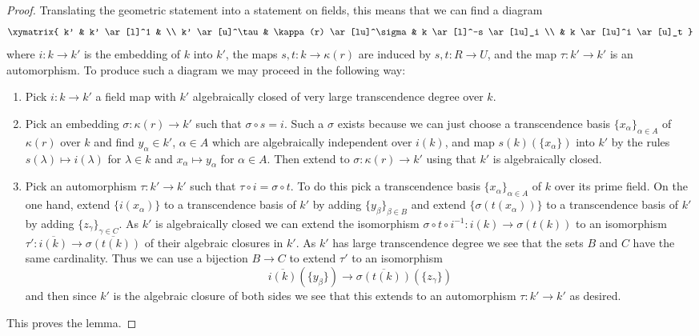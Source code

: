 \begin{proof}
Translating the geometric statement into a statement on fields,
this means that we can find a diagram
$$
\xymatrix{
k' & k' \ar[l]^1 & \\
k' \ar[u]^\tau & \kappa(r) \ar[lu]^\sigma & k \ar[l]^-s \ar[lu]_i \\
& k \ar[lu]^i \ar[u]_t
}
$$
where $i : k \to k'$ is the embedding of $k$ into $k'$,
the maps $s, t : k \to \kappa(r)$ are induced by $s, t : R \to U$, and
the map $\tau : k' \to k'$ is an automorphism. To produce such
a diagram we may proceed in the following way:
\begin{enumerate}
\item Pick $i : k \to k'$ a field map with $k'$ algebraically closed of
very large transcendence degree over $k$.
\item Pick an embedding $\sigma : \kappa(r) \to k'$ such that
$\sigma \circ s = i$. Such a $\sigma$ exists because we can just
choose a transcendence basis $\{x_\alpha\}_{\alpha \in A}$ of $\kappa(r)$
over $k$ and find $y_\alpha \in k'$, $\alpha \in A$ which are algebraically
independent over $i(k)$, and map $s(k)(\{x_\alpha\})$ into $k'$ by
the rules $s(\lambda) \mapsto i(\lambda)$ for $\lambda \in k$
and $x_\alpha \mapsto y_\alpha$ for $\alpha \in A$.
Then extend to $\sigma : \kappa(r) \to k'$ using that $k'$ is
algebraically closed.
\item Pick an automorphism $\tau : k' \to k'$ such that
$\tau \circ i = \sigma \circ t$. To do this pick a transcendence
basis $\{x_\alpha\}_{\alpha \in A}$ of $k$ over its prime field.
On the one hand, extend $\{i(x_\alpha)\}$ to a transcendence basis of
$k'$ by adding $\{y_\beta\}_{\beta \in B}$ and extend
$\{\sigma(t(x_\alpha))\}$ to a transcendence basis of $k'$ by adding
$\{z_\gamma\}_{\gamma \in C}$.
As $k'$ is algebraically closed we can extend the isomorphism
$\sigma \circ t \circ i^{-1} : i(k) \to \sigma(t(k))$
to an isomorphism $\tau' : \overline{i(k)} \to \overline{\sigma(t(k))}$
of their algebraic closures in $k'$.
As $k'$ has large transcendence degree
we see that the sets $B$ and $C$ have the same cardinality.
Thus we can use a bijection
$B \to C$ to extend $\tau'$ to an isomorphism
$$
\overline{i(k)}(\{y_\beta\})
\longrightarrow
\overline{\sigma(t(k))}(\{z_\gamma\})
$$
and then since $k'$ is the algebraic closure of both sides we
see that this extends to an automorphism $\tau : k' \to k'$
as desired.
\end{enumerate}
This proves the lemma.
\end{proof}

